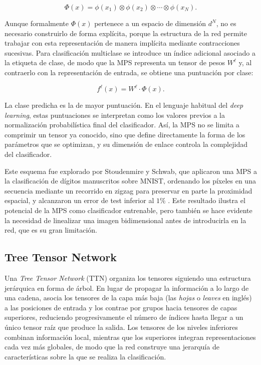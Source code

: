 \[ \Phi(x)=\phi(x_1)\otimes \phi(x_2)\otimes \cdots \otimes \phi(x_N). \]

Aunque formalmente $\Phi(x)$ pertenece a un espacio de dimensión $d^N$, no es necesario construirlo de forma explícita, porque la estructura de la red permite trabajar con esta representación de manera implícita mediante contracciones sucesivas. Para clasificación multiclase se introduce un índice adicional asociado a la etiqueta de clase, de modo que la MPS representa un tensor de pesos $W^{\ell}$ y, al contraerlo con la representación de entrada, se obtiene una puntuación por clase:

\[ f^{\ell}(x)= W^{\ell}\cdot \Phi(x). \]

La clase predicha es la de mayor puntuación. En el lenguaje habitual del \textit{deep learning}, estas puntuaciones se interpretan como los valores previos a la normalización probabilística final del clasificador. Así, la MPS no se limita a comprimir un tensor ya conocido, sino que define directamente la forma de los parámetros que se optimizan, y su dimensión de enlace controla la complejidad del clasificador.

Este esquema fue explorado por Stoudenmire y Schwab, que aplicaron una MPS a la clasificación de dígitos manuscritos sobre MNIST, ordenando los píxeles en una secuencia mediante un recorrido en zigzag para preservar en parte la proximidad espacial, y alcanzaron un error de test inferior al $1\%$ . Este resultado ilustra el potencial de la MPS como clasificador entrenable, pero también se hace evidente la necesidad de linealizar una imagen bidimensional antes de introducirla en la red, que es su gran limitación.

\subsection{Tree Tensor Network}

Una \textit{Tree Tensor Network} (TTN) organiza los tensores siguiendo una estructura jerárquica en forma de árbol. En lugar de propagar la información a lo largo de una cadena, asocia los tensores de la capa más baja (las \textit{hojas} o \textit{leaves} en inglés) a las posiciones de entrada y los contrae por grupos hacia tensores de capas superiores, reduciendo progresivamente el número de índices hasta llegar a un único tensor raíz que produce la salida. Los tensores de los niveles inferiores combinan información local, mientras que los superiores integran representaciones cada vez más globales, de modo que la red construye una jerarquía de características sobre la que se realiza la clasificación.

